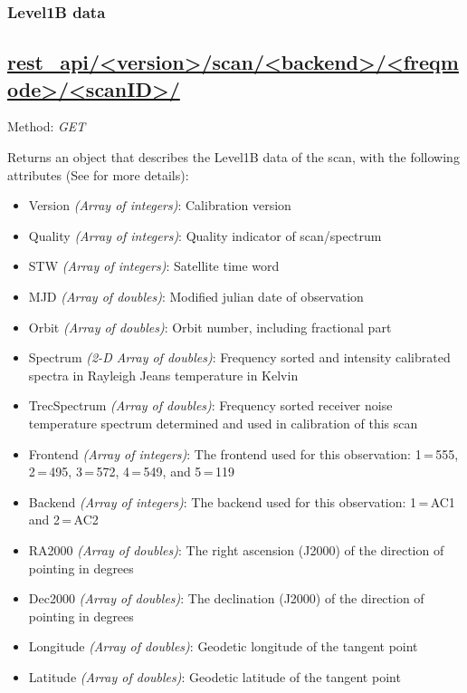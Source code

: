 \subsubsection{Level1B data}
\subsection*{\url{rest_api/<version>/scan/<backend>/<freqmode>/<scanID>/}}
Method: \emph{GET}

Returns an object that describes the Level1B data of the scan,
with the following attributes (See \citet{atbdl1b} for more details):

\begin{itemize}

  \item Version \emph{(Array of integers)}: Calibration version
  \item Quality \emph{(Array of integers)}: Quality indicator of scan/spectrum
  \item STW \emph{(Array of integers)}: Satellite time word
  \item MJD \emph{(Array of doubles)}: Modified julian date of observation
  \item Orbit \emph{(Array of doubles)}: Orbit number, including fractional part
  \item Spectrum \emph{(2-D Array of doubles)}: Frequency sorted and intensity calibrated spectra
                       in Rayleigh Jeans temperature in Kelvin
  \item TrecSpectrum \emph{(Array of doubles)}: Frequency sorted receiver noise temperature spectrum
                       determined and used in calibration of this scan
  \item Frontend \emph{(Array of integers)}: The frontend used for this observation: 1\,=\,555, 2\,=\,495, 
                       3\,=\,572, 4\,=\,549, and 5\,=\,119
  \item Backend \emph{(Array of integers)}: The backend used for this observation: 1\,=\,AC1 and 2\,=\,AC2
  \item RA2000 \emph{(Array of doubles)}: The right ascension (J2000) of the direction of pointing in degrees
  \item Dec2000 \emph{(Array of doubles)}: The declination (J2000) of the direction of pointing in degrees
  \item Longitude \emph{(Array of doubles)}: Geodetic longitude of the tangent point
  \item Latitude \emph{(Array of doubles)}: Geodetic latitude of the tangent point

\end{itemize}
